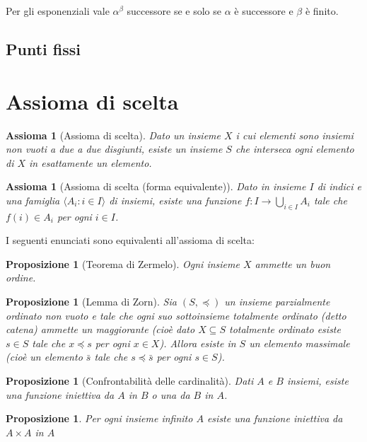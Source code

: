 \documentclass[a4paper,10pt,oneside]{article}
\newcommand{\myname}[1]{\emph{#1}}
\theoremstyle{plain}
\newtheorem{myprop}[mytheorem]{Proposizione}
\newtheorem{myax}[mytheorem]{Assioma}
\theoremstyle{definition}
\theoremstyle{remark}
\begin{document}
Per gli esponenziali vale $\alpha^\beta$ successore se e solo se $\alpha$ è successore e $\beta$ è finito.

\subsection{Punti fissi}






\section{Assioma di scelta}

\begin{myax}[Assioma di scelta]
 Dato un insieme $X$ i cui elementi sono insiemi non vuoti a due a due disgiunti, esiste un insieme $S$ che interseca ogni elemento di $X$ in esattamente un elemento.
\end{myax}
\begin{myax}[Assioma di scelta (forma equivalente)]
 Dato in insieme $I$ di indici e una famiglia $\langle A_i : i \in I\rangle$ di insiemi, esiste una funzione $f:I \rightarrow \bigcup_{i\in I}A_i$ tale che $f(i)\in A_i$ per ogni $i\in I$.
\end{myax}

I seguenti enunciati sono equivalenti all'assioma di scelta:

\begin{myprop}[Teorema di Zermelo]
 Ogni insieme $X$ ammette un buon ordine. 
\end{myprop}
\begin{myprop}[Lemma di Zorn]
 Sia $(S,\preceq)$ un insieme parzialmente ordinato non vuoto e tale che ogni suo sottoinsieme totalmente ordinato (detto \myname{catena}) ammette un maggiorante
 (cioè dato $X \subseteq S$ totalmente ordinato esiste $s\in S$ tale che $x\preceq s$ per ogni $x\in X$). Allora esiste in $S$ un elemento massimale
 (cioè un elemento $\bar s$ tale che $s \preceq \bar s$ per ogni $s\in S$).
\end{myprop}
\begin{myprop}[Confrontabilità delle cardinalità]
 Dati $A$ e $B$ insiemi, esiste una funzione iniettiva da $A$ in $B$ o una da $B$ in $A$.
\end{myprop}
\begin{myprop}
 Per ogni insieme infinito $A$ esiste una funzione iniettiva da $A \times A$ in $A$
\end{myprop}
\end{document}
